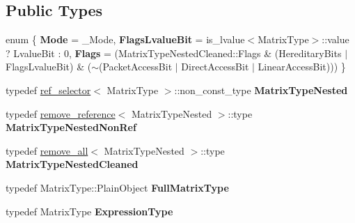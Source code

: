 \subsection*{Public Types}
\begin{DoxyCompactItemize}
\item 
\mbox{\label{struct_eigen_1_1internal_1_1traits_3_01_triangular_view_3_01_matrix_type_00_01___mode_01_4_01_4_a67a8c16208ef6dd9fec95c8ae2c0367b}} 
enum \{ {\bfseries Mode} = \+\_\+\+Mode, 
{\bfseries Flags\+Lvalue\+Bit} = is\+\_\+lvalue$<$Matrix\+Type$>$\+::value ? Lvalue\+Bit \+: 0, 
{\bfseries Flags} = (Matrix\+Type\+Nested\+Cleaned\+::Flags \& (Hereditary\+Bits $\vert$ Flags\+Lvalue\+Bit) \& ($\sim$(Packet\+Access\+Bit $\vert$ Direct\+Access\+Bit $\vert$ Linear\+Access\+Bit)))
 \}
\item 
\mbox{\label{struct_eigen_1_1internal_1_1traits_3_01_triangular_view_3_01_matrix_type_00_01___mode_01_4_01_4_a0c27455b30110fdb375cc5711476561d}} 
typedef \mbox{\hyperlink{struct_eigen_1_1internal_1_1ref__selector}{ref\+\_\+selector}}$<$ Matrix\+Type $>$\+::non\+\_\+const\+\_\+type {\bfseries Matrix\+Type\+Nested}
\item 
\mbox{\label{struct_eigen_1_1internal_1_1traits_3_01_triangular_view_3_01_matrix_type_00_01___mode_01_4_01_4_aaf52a4904b35eabbf5a273ed7f6c2f8d}} 
typedef \mbox{\hyperlink{struct_eigen_1_1internal_1_1remove__reference}{remove\+\_\+reference}}$<$ Matrix\+Type\+Nested $>$\+::type {\bfseries Matrix\+Type\+Nested\+Non\+Ref}
\item 
\mbox{\label{struct_eigen_1_1internal_1_1traits_3_01_triangular_view_3_01_matrix_type_00_01___mode_01_4_01_4_a0fb8e643eb568abfd21a43009024300c}} 
typedef \mbox{\hyperlink{struct_eigen_1_1internal_1_1remove__all}{remove\+\_\+all}}$<$ Matrix\+Type\+Nested $>$\+::type {\bfseries Matrix\+Type\+Nested\+Cleaned}
\item 
\mbox{\label{struct_eigen_1_1internal_1_1traits_3_01_triangular_view_3_01_matrix_type_00_01___mode_01_4_01_4_ae095786a046526775ef19b7e9e081acd}} 
typedef Matrix\+Type\+::\+Plain\+Object {\bfseries Full\+Matrix\+Type}
\item 
\mbox{\label{struct_eigen_1_1internal_1_1traits_3_01_triangular_view_3_01_matrix_type_00_01___mode_01_4_01_4_a1d0a29012b48a59e2376f4154db5130d}} 
typedef Matrix\+Type {\bfseries Expression\+Type}
\end{DoxyCompactItemize}


